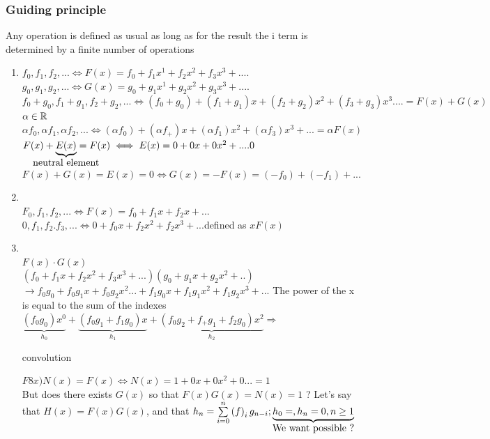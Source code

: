 \documentclass[12pt,a4paper]{article}
\begin{document}
\subsubsection{Guiding principle} 
\begin{boite}
Any operation is defined as usual as long as for the result the i term is determined by a finite number of operations
\end{boite}
\begin{enumerate}
	\item $f_0,f_1,f_2,... \iff F(x) = f_0 + f_1x^1 + f_2x^2 + f_3x^3+....$\\
	$g_0,g_1,g_2,... \iff G(x) = g_0+g_1x^1+g_2x^2+g_3x^3+....$\\
	$f_0+g_0,f_1+g_1,f_2+g_2,... \iff (f_0+g_0)+(f_1+g_1)x+(f_2+g_2)x^2+(f_3+g_3)x^3.... = F(x) + G(x)$\\
	$\alpha \in \mathbb{R}$\\
	$\alpha f_0,\alpha f_1,\alpha f_2,... \iff (\alpha f_0)+(\alpha f_+)x+(\alpha f_1)x^2+(\alpha f_3)x^3+...=\alpha F(x)$\\
	$F(x) + \underbrace{E(x)}_{\mathclap{\mbox{neutral element}}} = F(x) \iff E(x) = 0 + 0x + 0x^2 +.... 0$\\
	$F(x) + G(x) =E(x) = 0 \iff G(x) = -F(x) = (-f_0) + (-f_1) + ...$
	\item {}\\
	$F_0,f_1,f_2,... \iff F(x) = f_0 + f_1x + f_2x +...$\\
	$0,f_1,f_2.f_3,... \iff 0 + f_0x + f_2x^2 + f_2x^3 + ... $defined as $xF(x)$
	\item {}\\
	$F(x)\cdot G(x)$\\
	$(f_0+f_1x+f_2x^2+f_3x^3+...)(g_0+g_1x+g_2x^2+..)$\\
	$\to f_0g_0+f_0g_1x+f_0g_2x^2...+f_1g_0x+f_1g_1x^2 + f_1g_2x^3+...$ The power of the x is equal to the sum of the indexes\\
	$\underbrace{(f_0g_0)x^0}_{h_0} + \underbrace{(f_0g_1+f_1g_0)x}_{h_1} +\underbrace{(f_0g_2+f_+g_1+f_2g_0)x^2}_{h_2} \Rightarrow$
	\begin{boite}[0.4]
		 convolution
		\end{boite}
	$F8x)N(x) = F(x) \iff N(x) = 1 + 0x + 0x^2 + 0... = 1$\\
	But does there exists $G(x)$ so that $F(x)G(x) = N(x) = 1$ ? Let's say that $H(x) = F(x)G(x)$, and that $h_n = \somme{n}{i=0}f_ig_{n-i} ; \underbrace{h_0 = , h_n = 0, n \geq 1}_{\mathclap{\mbox{We want possible ?}}}$\\

\end{enumerate}
\end{document}

